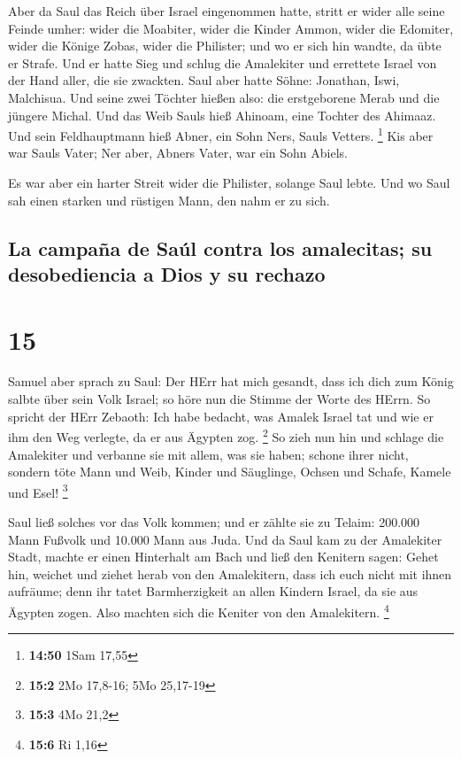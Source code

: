  Aber da Saul das Reich über Israel eingenommen hatte,
stritt er wider alle seine Feinde umher: wider die Moabiter, wider die
Kinder Ammon, wider die Edomiter, wider die Könige Zobas, wider die
Philister; und wo er sich hin wandte, da übte er Strafe. 
Und er hatte Sieg und schlug die Amalekiter und errettete Israel von der
Hand aller, die sie zwackten.  Saul aber hatte Söhne:
Jonathan, Iswi, Malchisua. Und seine zwei Töchter hießen also: die
erstgeborene Merab und die jüngere Michal.  Und das Weib
Sauls hieß Ahinoam, eine Tochter des Ahimaaz. Und sein Feldhauptmann
hieß Abner, ein Sohn Ners, Sauls Vetters. \footnote{\textbf{14:50} 1Sam
  17,55}  Kis aber war Sauls Vater; Ner aber, Abners
Vater, war ein Sohn Abiels.

 Es war aber ein harter Streit wider die Philister,
solange Saul lebte. Und wo Saul sah einen starken und rüstigen Mann, den
nahm er zu sich.

\hypertarget{la-campauxf1a-de-sauxfal-contra-los-amalecitas-su-desobediencia-a-dios-y-su-rechazo}{%
\subsection{La campaña de Saúl contra los amalecitas; su desobediencia a
Dios y su
rechazo}\label{la-campauxf1a-de-sauxfal-contra-los-amalecitas-su-desobediencia-a-dios-y-su-rechazo}}

\hypertarget{section-14}{%
\section{15}\label{section-14}}

 Samuel aber sprach zu Saul: Der HErr hat mich gesandt,
dass ich dich zum König salbte über sein Volk Israel; so höre nun die
Stimme der Worte des HErrn.  So spricht der HErr Zebaoth:
Ich habe bedacht, was Amalek Israel tat und wie er ihm den Weg verlegte,
da er aus Ägypten zog. \footnote{\textbf{15:2} 2Mo 17,8-16; 5Mo 25,17-19}
 So zieh nun hin und schlage die Amalekiter und verbanne
sie mit allem, was sie haben; schone ihrer nicht, sondern töte Mann und
Weib, Kinder und Säuglinge, Ochsen und Schafe, Kamele und Esel!
\footnote{\textbf{15:3} 4Mo 21,2}

 Saul ließ solches vor das Volk kommen; und er zählte sie
zu Telaim: 200.000 Mann Fußvolk und 10.000 Mann aus Juda. 
Und da Saul kam zu der Amalekiter Stadt, machte er einen Hinterhalt am
Bach  und ließ den Kenitern sagen: Gehet hin, weichet und
ziehet herab von den Amalekitern, dass ich euch nicht mit ihnen
aufräume; denn ihr tatet Barmherzigkeit an allen Kindern Israel, da sie
aus Ägypten zogen. Also machten sich die Keniter von den Amalekitern.
\footnote{\textbf{15:6} Ri 1,16}

